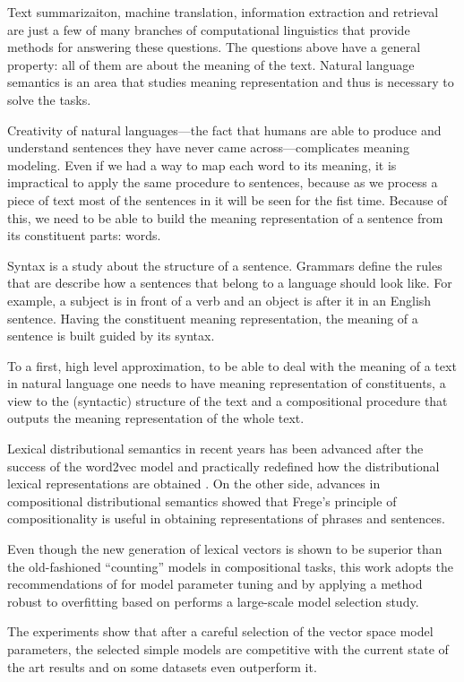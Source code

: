 Text summarizaiton, machine translation, information extraction and retrieval are just a few of many branches of computational linguistics that provide methods for answering these questions. The questions above have a general property: all of them are about the meaning of the text. Natural language semantics is an area that studies meaning representation and thus is necessary to solve the tasks.

Creativity of natural languages---the fact that humans are able to produce and understand sentences they have never came across---complicates meaning modeling. Even if we had a way to map each word to its meaning, it is impractical to apply the same procedure to sentences, because as we process a piece of text most of the sentences in it will be seen for the fist time. Because of this, we need to be able to build the meaning representation of a sentence from its constituent parts: words.

Syntax is a study about the structure of a sentence. Grammars define the rules that are describe how a sentences that belong to a language should look like. For example, a subject is in front of a verb and an object is after it in an English sentence. Having the constituent meaning representation, the meaning of a sentence is built guided by its syntax.

To a first, high level approximation, to be able to deal with the meaning of a text in natural language one needs to have meaning representation of constituents, a view to the (syntactic) structure of the text and a compositional procedure that outputs the meaning representation of the whole text.

Lexical distributional semantics \cite{BullinariaLevy2012,Bullinaria2007,Turney:2010:FMV:1861751.1861756} in recent years has been advanced after the success of the word2vec model \cite{mikolov2013linguistic,mikolov2013distributed,mikolov2013efficient} and practically redefined how the distributional lexical representations are obtained \cite{baroni-dinu-kruszewski:2014:P14-1}. On the other side, advances in compositional distributional semantics \cite{mitchell2010composition,maillard-clark-grefenstette:2014:TTNLS,Grefenstette:2011:ESC:2145432.2145580,Grefenstette:2011:ETV:2140490.2140497,kartsadrqpl2014,fried-polajnar-clark:2015:ACL-IJCNLP} showed that Frege's principle of compositionality \cite{Janssen2001} is useful in obtaining representations of phrases and sentences.

Even though the new generation of lexical vectors is shown to be superior than the old-fashioned ``counting'' models \cite{milajevs-EtAl:2014:EMNLP2014} in compositional tasks, this work adopts the recommendations of  for model parameter tuning and by applying a method robust to overfitting based on  performs a large-scale model selection study.

The experiments show that after a careful selection of the vector space model parameters, the selected simple models are competitive with the current state of the art results and on some datasets even outperform it.

